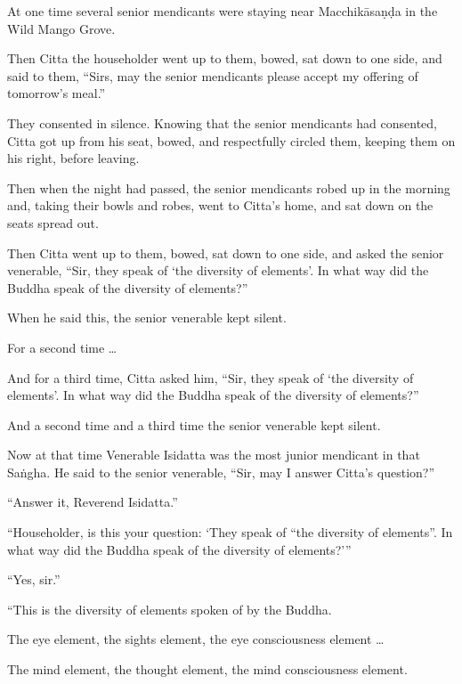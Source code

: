 \documentclass[12pt,openany]{book}%
\begin{document}
At one time several senior mendicants were staying near \textsanskrit{Macchikāsaṇḍa} in the Wild Mango Grove. 

Then Citta the householder went up to them, bowed, sat down to one side, and said to them, “Sirs, may the senior mendicants please accept my offering of tomorrow’s meal.” 

They consented in silence. Knowing that the senior mendicants had consented, Citta got up from his seat, bowed, and respectfully circled them, keeping them on his right, before leaving. 

Then when the night had passed, the senior mendicants robed up in the morning and, taking their bowls and robes, went to Citta’s home, and sat down on the seats spread out. 

Then Citta went up to them, bowed, sat down to one side, and asked the senior venerable, “Sir, they speak of ‘the diversity of elements’. In what way did the Buddha speak of the diversity of elements?” 

When he said this, the senior venerable kept silent. 

For a second time … 

And for a third time, Citta asked him, “Sir, they speak of ‘the diversity of elements’. In what way did the Buddha speak of the diversity of elements?” 

And a second time and a third time the senior venerable kept silent. 

Now at that time Venerable Isidatta was the most junior mendicant in that \textsanskrit{Saṅgha}. He said to the senior venerable, “Sir, may I answer Citta’s question?” 

“Answer it, Reverend Isidatta.” 

“Householder, is this your question: ‘They speak of “the diversity of elements”. In what way did the Buddha speak of the diversity of elements?’” 

“Yes, sir.” 

“This is the diversity of elements spoken of by the Buddha. 

The eye element, the sights element, the eye consciousness element … 

The mind element, the thought element, the mind consciousness element. 
\end{document}

